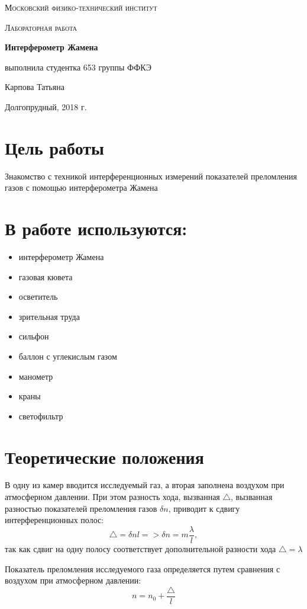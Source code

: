 \documentclass[a4paper]{article}
\begin{document}
\begin{titlepage}
	\centering
	\vspace{5cm}
	{\scshape\LARGE Московский физико-технический институт \par}
	\vspace{4cm}
	{\scshape\Large Лабораторная работа \par}
	\vspace{1cm}
	{\huge\bfseries Интерферометр Жамена \par}
	\vspace{1cm}
	\vfill
\begin{flushright}
	{\large выполнила студентка 653 группы ФФКЭ}\par
	\vspace{0.3cm}
	{\LARGE Карпова Татьяна}
\end{flushright}
	

	\vfill

	Долгопрудный, 2018 г.
\end{titlepage}

\section{Цель работы}
Знакомство с техникой интерференционных измерений показателей преломления газов с помощью интерферометра Жамена

\section{В работе используются:}
\begin{itemize}
    \item интерферометр Жамена
    \item газовая кювета
    \item осветитель
    \item зрительная труда
    \item сильфон
    \item баллон с углекислым газом
    \item манометр
    \item краны
    \item светофильтр
\end{itemize}

\section{Теоретические положения}
В одну из камер вводится исследуемый газ, а вторая заполнена воздухом при атмосферном давлении. При этом разность хода, вызванная $\triangle$, вызванная разностью показателей преломления газов $\delta n$, приводит к сдвигу интерференционных полос:
\begin{equation}
    \triangle = \delta n l => \delta n = m \frac{\lambda}{l},
\end{equation}
так как сдвиг на одну полосу соответствует дополнительной разности хода $\triangle = \lambda$ \par
Показатель преломления исследуемого газа определяется путем сравнения с воздухом при атмосферном давлении:
\begin{equation}
    n = n_0 + \frac{\triangle}{l}
\end{equation}
\end{document}
